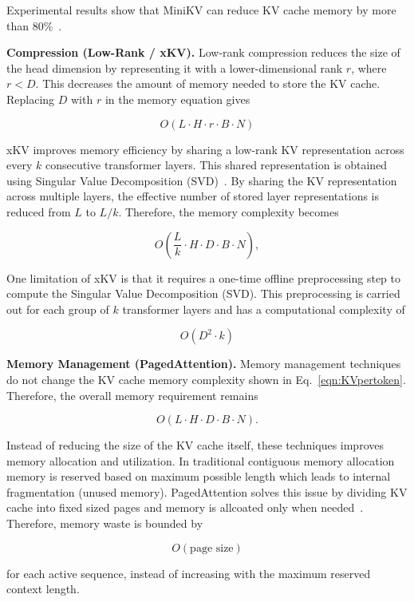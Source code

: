 \documentclass[conference]{IEEEtran}
\begin{document}
Experimental results show that MiniKV can reduce KV cache memory by more than 80\%~\cite{sharma2025minikv}.


\textbf{Compression (Low-Rank / xKV).} Low-rank compression reduces the size of the head dimension by representing it with a lower-dimensional rank $r$, where $r<D$. This decreases the amount of memory needed to store the KV cache. Replacing $D$ with $r$ in the memory equation gives

\[
	O(L\cdot H\cdot r\cdot B\cdot N)
\]

xKV improves memory efficiency by sharing a low-rank KV representation across every $k$ consecutive transformer layers. This shared representation is obtained using Singular Value Decomposition (SVD)~\cite{chang2025xkv}. By sharing the KV representation across multiple layers, the effective number of stored layer representations is reduced from $L$ to $L/k$. Therefore, the memory complexity becomes

\[
	O\left(
	\frac{L}{k}\cdot H\cdot D\cdot B\cdot N
	\right),
\]

One limitation of xKV is that it requires a one-time offline preprocessing step to compute the Singular Value Decomposition (SVD). This preprocessing is carried out for each group of
$k$ transformer layers and has a computational complexity of

\[
	O(D^2\cdot k)
\]


\textbf{Memory Management (PagedAttention).} Memory management techniques do not change the KV cache memory complexity shown in Eq.~\eqref{eqn:KVpertoken}. Therefore, the overall memory requirement remains

\[
	O(L\cdot H\cdot D\cdot B\cdot N).
\]

Instead of reducing the size of the KV cache itself, these techniques improves memory allocation and utilization. In traditional contiguous memory allocation memory is reserved based on maximum possible length which leads to internal fragmentation (unused memory). PagedAttention solves this issue by dividing KV cache into fixed sized pages and memory is allcoated only when needed~\cite{kwon2023vllm}. Therefore, memory waste is bounded by

\[
	O(\text{page size})
\]

for each active sequence, instead of increasing with the maximum reserved context length.

\end{document}
